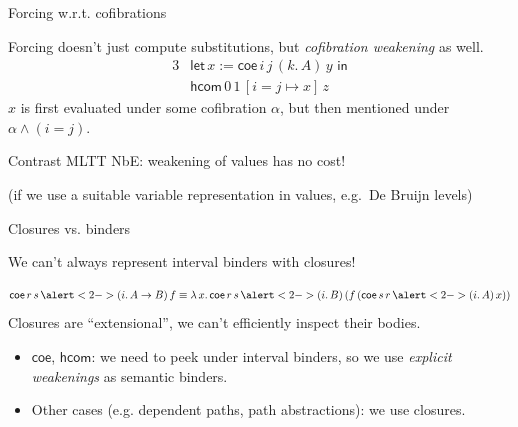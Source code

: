 \documentclass[dvipsnames]{beamer}
\newcommand{\ms}[1]{\mathsf{#1}}
\newcommand{\coe}{\mathsf{coe}}
\newcommand{\hcom}{\ms{hcom}}
\begin{document}
\begin{frame}{Forcing w.r.t. cofibrations}

Forcing doesn't just compute substitutions, but \emph{cofibration weakening} as well.
\begin{alignat*}{3}
  & \ms{let}\,x := \coe\,i\,j\,(k.\,A)\,y\,\,\ms{in}\\
  & \hcom\,0\,1\,[i = j \mapsto x]\,z
\end{alignat*}
$x$ is first evaluated under some cofibration $\alpha$, but then mentioned under
$\alpha \land (i = j)$.
\pause
\vspace{1em}

Contrast MLTT NbE: weakening of values has no cost!

(\footnotesize if we use a suitable variable representation in values, e.g.\ De Bruijn levels)

\end{frame}

\begin{frame}{Closures vs. binders}

We can't always represent interval binders with closures!

\[ \coe\,r\,s\,\alert<2->{(i.\,A \to B)}\,f \equiv \lambda\,x.\,\coe\,r\,s\,\alert<2->{(i.\,B)}\,(f\,(\coe\,s\,r\,\alert<2->{(i.\,A)}\,x)) \]
\pause
\pause
Closures are ``extensional'', we can't efficiently inspect their bodies.
\vspace{0.5em}
\pause

\begin{itemize}
  \item $\coe$, $\hcom$: we need to peek under interval binders, so we use \emph{explicit weakenings} as semantic binders.
  \item Other cases (e.g. dependent paths, path abstractions): we use closures.
\end{itemize}

\end{frame}
\end{document}
